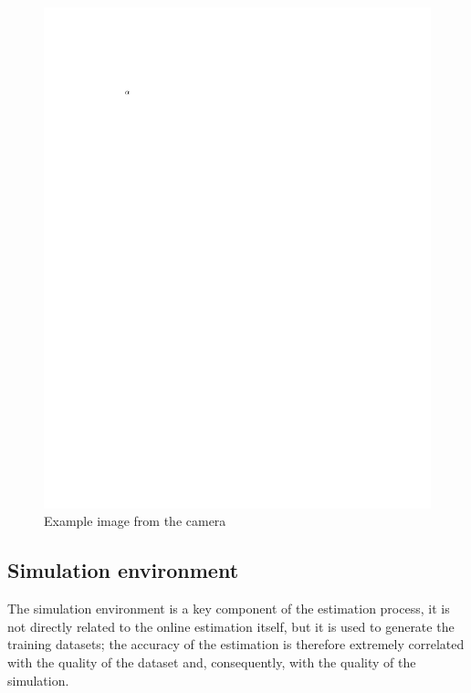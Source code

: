\documentclass[a4paper,12pt,sort&compress]{article}
\begin{document}
    \begin{figure}
        \centering
        \includegraphics[width=0.6\linewidth]{a.pdf}
        \caption{Example image from the camera}
        \label{fig:camera_example}
    \end{figure}
    

    \subsection{Simulation environment}
    The simulation environment is a key component of the estimation process, it
    is not directly related to the online estimation itself, but it is used to
    generate the training datasets; the accuracy of the estimation is therefore
    extremely correlated with the quality of the dataset and, consequently, with
    the quality of the simulation. 
\end{document}
